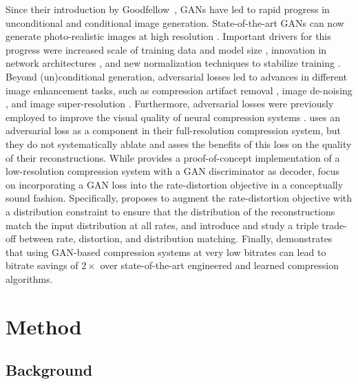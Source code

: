 Since their introduction by Goodfellow~\etal \cite{goodfellow2014generative}, GANs have led to rapid progress in unconditional and conditional image generation. State-of-the-art GANs can now generate photo-realistic images at high resolution \cite{brock2018large, karras2019style, park2019semantic}. Important drivers for this progress were increased scale of training data and model size \cite{brock2018large}, innovation in network architectures \cite{karras2019style}, and new normalization techniques to stabilize training \cite{miyato2018spectral}. Beyond (un)conditional generation, adversarial losses led to advances in different image enhancement tasks, such as compression artifact removal \cite{galteri2017deep}, image de-noising \cite{chen2018image}, and image super-resolution \cite{ledig2017photo}. Furthermore, adversarial losses were previously employed to improve the visual quality of neural compression systems \cite{rippel17a, santurkar2018generative, tschannen2018deep, agustsson2019extreme, blau2019rethinking}. \cite{rippel17a} uses an adversarial loss as a component in their full-resolution compression system, but they do not systematically ablate and asses the benefits of this loss on the quality of their reconstructions. While \cite{santurkar2018generative} provides a proof-of-concept implementation of a low-resolution compression system with a GAN discriminator as decoder, \cite{tschannen2018deep, blau2019rethinking} focus on incorporating a GAN loss into the rate-distortion objective in a conceptually sound fashion. Specifically, \cite{tschannen2018deep} proposes to augment the rate-distortion objective with a distribution constraint to ensure that the distribution of the reconstructions match the input distribution at all rates, and \cite{blau2019rethinking} introduce and study a triple trade-off between rate, distortion, and distribution matching. Finally, \cite{agustsson2019extreme} demonstrates that using GAN-based compression systems at very low bitrates can lead to bitrate savings of $2\times$ over state-of-the-art engineered and learned compression algorithms.

\section{Method}
\subsection{Background}

